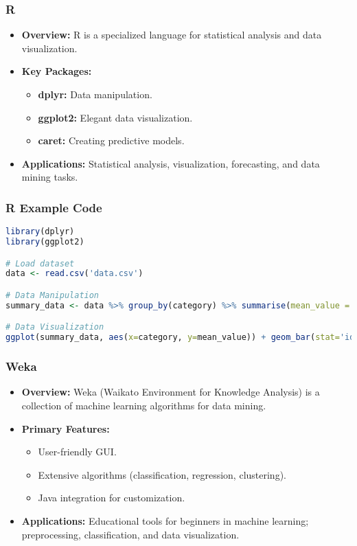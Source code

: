 \documentclass[aspectratio=169]{beamer}
\begin{document}
\begin{frame}
    \frametitle{R}
    \begin{itemize}
        \item \textbf{Overview:} 
        R is a specialized language for statistical analysis and data visualization.
        
        \item \textbf{Key Packages:}
        \begin{itemize}
            \item \textbf{dplyr:} Data manipulation.
            \item \textbf{ggplot2:} Elegant data visualization.
            \item \textbf{caret:} Creating predictive models.
        \end{itemize}
        
        \item \textbf{Applications:} 
        Statistical analysis, visualization, forecasting, and data mining tasks.
    \end{itemize}
\end{frame}

\begin{frame}[fragile]
    \frametitle{R Example Code}
    \begin{lstlisting}[language=R]
library(dplyr)
library(ggplot2)

# Load dataset
data <- read.csv('data.csv')

# Data Manipulation
summary_data <- data %>% group_by(category) %>% summarise(mean_value = mean(value))

# Data Visualization
ggplot(summary_data, aes(x=category, y=mean_value)) + geom_bar(stat='identity')
    \end{lstlisting}
\end{frame}

\begin{frame}
    \frametitle{Weka}
    \begin{itemize}
        \item \textbf{Overview:}
        Weka (Waikato Environment for Knowledge Analysis) is a collection of machine learning algorithms for data mining.
        
        \item \textbf{Primary Features:}
        \begin{itemize}
            \item User-friendly GUI.
            \item Extensive algorithms (classification, regression, clustering).
            \item Java integration for customization.
        \end{itemize}
        
        \item \textbf{Applications:}
        Educational tools for beginners in machine learning; preprocessing, classification, and data visualization.
    \end{itemize}
\end{frame}
\end{document}
